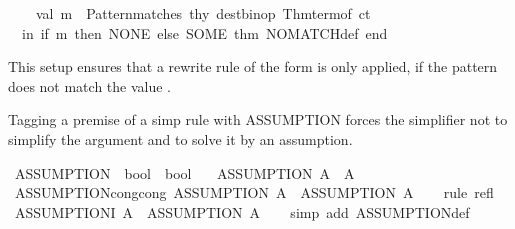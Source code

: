 \begin{isabellebody}
\ \ \ \ val\ m\ {\isacharequal}{\kern0pt}\ Pattern{\isachardot}{\kern0pt}matches\ thy\ {\isacharparenleft}{\kern0pt}dest{\isacharunderscore}{\kern0pt}binop\ {\isacharparenleft}{\kern0pt}Thm{\isachardot}{\kern0pt}term{\isacharunderscore}{\kern0pt}of\ ct{\isacharparenright}{\kern0pt}{\isacharparenright}{\kern0pt}\isanewline
\ \ in\ if\ m\ then\ NONE\ else\ SOME\ {\isacharat}{\kern0pt}{\isacharbraceleft}{\kern0pt}thm\ NO{\isacharunderscore}{\kern0pt}MATCH{\isacharunderscore}{\kern0pt}def{\isacharbraceright}{\kern0pt}\ end\isanewline
{\isacartoucheclose}%
\endisatagML
{\isafoldML}%
%
\isadelimML
%
\endisadelimML
%
\begin{isamarkuptext}%
This setup ensures that a rewrite rule of the form 
  is only applied, if the pattern  does not match the value .%
\end{isamarkuptext}\isamarkuptrue%
%
\begin{isamarkuptext}%
Tagging a premise of a simp rule with ASSUMPTION forces the simplifier
  not to simplify the argument and to solve it by an assumption.%
\end{isamarkuptext}\isamarkuptrue%
\isamarkupfalse%
\ ASSUMPTION\ {\isacharcolon}{\kern0pt}{\isacharcolon}{\kern0pt}\ {\isachardoublequoteopen}bool\ {\isasymRightarrow}\ bool{\isachardoublequoteclose}\isanewline
\ \ \ {\isachardoublequoteopen}ASSUMPTION\ A\ {\isasymequiv}\ A{\isachardoublequoteclose}\isanewline
\isanewline
{}\isamarkupfalse%
\ ASSUMPTION{\isacharunderscore}{\kern0pt}cong{\isacharbrackleft}{\kern0pt}cong{\isacharbrackright}{\kern0pt}{\isacharcolon}{\kern0pt}\ {\isachardoublequoteopen}ASSUMPTION\ A\ {\isacharequal}{\kern0pt}\ ASSUMPTION\ A{\isachardoublequoteclose}\isanewline
%
\isadelimproof
\ \ %
\endisadelimproof
%
\isatagproof
{}\isamarkupfalse%
\ {\isacharparenleft}{\kern0pt}rule\ refl{\isacharparenright}{\kern0pt}%
\endisatagproof
{\isafoldproof}%
%
\isadelimproof
\isanewline
%
\endisadelimproof
\isanewline
{}\isamarkupfalse%
\ ASSUMPTION{\isacharunderscore}{\kern0pt}I{\isacharcolon}{\kern0pt}\ {\isachardoublequoteopen}A\ {\isasymLongrightarrow}\ ASSUMPTION\ A{\isachardoublequoteclose}\isanewline
%
\isadelimproof
\ \ %
\endisadelimproof
%
\isatagproof
{}\isamarkupfalse%
\ {\isacharparenleft}{\kern0pt}simp\ add{\isacharcolon}{\kern0pt}\ ASSUMPTION{\isacharunderscore}{\kern0pt}def{\isacharparenright}{\kern0pt}%
\endisatagproof
{\isafoldproof}%
%
\isadelimproof

\end{isabellebody}
